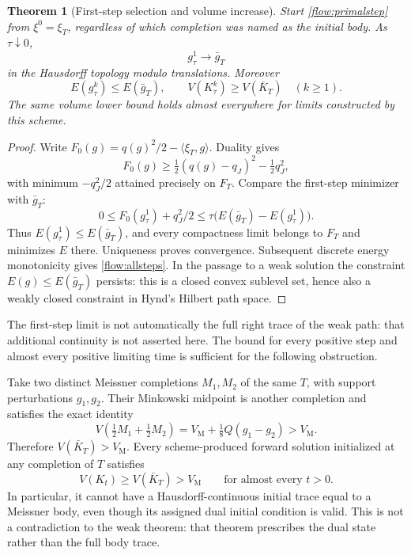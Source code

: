 \documentclass[11pt]{article}
\newtheorem{theorem}{Theorem}[section]
\theoremstyle{remark}\newtheorem{remark}[theorem]{Remark}
\newcommand{\VM}{V_{\mathrm M}}
\begin{document}
\begin{theorem}[First-step selection and volume increase]\label{flow:selection}
Start \eqref{flow:primalstep} from $\xi^0=\xi_T$, regardless of which completion was named as the initial body. As $\tau\downarrow0$,
\[
 g^1_\tau\longrightarrow\bar g_T
\]
in the Hausdorff topology modulo translations. Moreover
\begin{equation}\label{flow:allsteps}
 E(g^k_\tau)\leq E(\bar g_T),\qquad
 V(K^k_\tau)\geq V(\bar K_T)\quad(k\geq1).
\end{equation}
The same volume lower bound holds almost everywhere for limits constructed by this scheme.
\end{theorem}
\begin{proof}
Write $F_0(g)=q(g)^2/2-\langle\xi_T,g\rangle$. Duality gives
\[
 F_0(g)\geq\tfrac12(q(g)-q_J)^2-\tfrac12q_J^2,
\]
with minimum $-q_J^2/2$ attained precisely on $F_T$. Compare the first-step minimizer with $\bar g_T$:
\[
 0\leq F_0(g^1_\tau)+q_J^2/2
 \leq\tau\big(E(\bar g_T)-E(g^1_\tau)\big).
\]
Thus $E(g^1_\tau)\leq E(\bar g_T)$, and every compactness limit belongs to $F_T$ and minimizes $E$ there. Uniqueness proves convergence. Subsequent discrete energy monotonicity gives \eqref{flow:allsteps}. In the passage to a weak solution the constraint $E(g)\leq E(\bar g_T)$ persists: this is a closed convex sublevel set, hence also a weakly closed constraint in Hynd's Hilbert path space.
\end{proof}
The first-step limit is not automatically the full right trace of the weak path: that additional continuity is not asserted here. The bound for every positive step and almost every positive limiting time is sufficient for the following obstruction.

Take two distinct Meissner completions $M_1,M_2$ of the same $T$, with support perturbations $g_1,g_2$. Their Minkowski midpoint is another completion and satisfies the exact identity
\begin{equation}\label{flow:midpoint}
 V\left(\tfrac12M_1+\tfrac12M_2\right)
 =\VM+\tfrac18 Q(g_1-g_2)>\VM.
\end{equation}
Therefore $V(\bar K_T)>\VM$. Every scheme-produced forward solution initialized at any completion of $T$ satisfies
\[
 V(K_t)\geq V(\bar K_T)>\VM\qquad\text{for almost every }t>0.
\]
In particular, it cannot have a Hausdorff-continuous initial trace equal to a Meissner body, even though its assigned dual initial condition is valid. This is not a contradiction to the weak theorem: that theorem prescribes the dual state rather than the full body trace.
\end{document}
